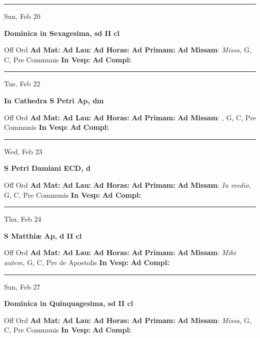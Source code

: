 \documentclass[letterpaper, 10pt]{article}
\begin{document}
\hrule
\begin{center}
Sun, Feb 20
\end{center}\textbf{ \large Dominica in Sexagesima, \textnormal{\normalsize sd II cl}}
\begin{justify}
Off Ord
\textbf{Ad Mat: }
\textbf{Ad Lau: }
\textbf{Ad Horas: }
\textbf{Ad Primam: }
\textbf{Ad Missam}: \textit{Missa,} G, C, Pre Communis
\textbf{In Vesp: }
\textbf{Ad Compl: }\end{justify}



\hrule
\begin{center}
Tue, Feb 22
\end{center}\textbf{ \large In Cathedra S Petri Ap, \textnormal{\normalsize dm}}
\begin{justify}
Off Ord
\textbf{Ad Mat: }
\textbf{Ad Lau: }
\textbf{Ad Horas: }
\textbf{Ad Primam: }
\textbf{Ad Missam}: \textit{,} G, C, Pre Communis
\textbf{In Vesp: }
\textbf{Ad Compl: }\end{justify}



\hrule
\begin{center}
Wed, Feb 23
\end{center}\textbf{ \large S Petri Damiani ECD, \textnormal{\normalsize d}}
\begin{justify}
Off Ord
\textbf{Ad Mat: }
\textbf{Ad Lau: }
\textbf{Ad Horas: }
\textbf{Ad Primam: }
\textbf{Ad Missam}: \textit{In medio,} G, C, Pre Communis
\textbf{In Vesp: }
\textbf{Ad Compl: }\end{justify}



\hrule
\begin{center}
Thu, Feb 24
\end{center}\textbf{ \large S Matthiæ Ap, \textnormal{\normalsize d II cl}}
\begin{justify}
Off Ord
\textbf{Ad Mat: }
\textbf{Ad Lau: }
\textbf{Ad Horas: }
\textbf{Ad Primam: }
\textbf{Ad Missam}: \textit{Mihi autem,} G, C, Pre de Apostolis
\textbf{In Vesp: }
\textbf{Ad Compl: }\end{justify}



\hrule
\begin{center}
Sun, Feb 27
\end{center}\textbf{ \large Dominica in Quinquagesima, \textnormal{\normalsize sd II cl}}
\begin{justify}
Off Ord
\textbf{Ad Mat: }
\textbf{Ad Lau: }
\textbf{Ad Horas: }
\textbf{Ad Primam: }
\textbf{Ad Missam}: \textit{Missa,} G, C, Pre Communis
\textbf{In Vesp: }
\textbf{Ad Compl: }\end{justify}
\end{document}
